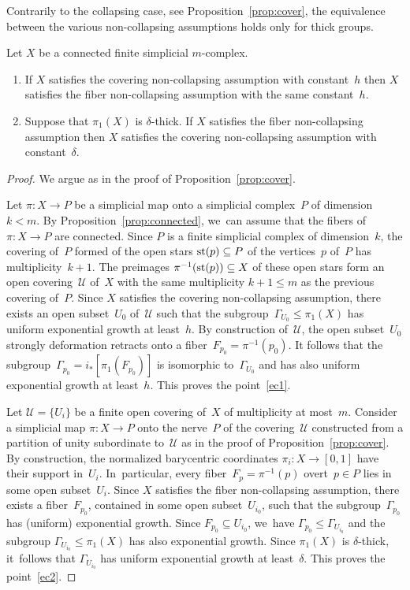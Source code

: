 Contrarily to the collapsing case, see Proposition~\ref{prop:cover}, the equivalence between the various non-collapsing assumptions holds only for thick groups.

\begin{proposition} \label{prop:exp.cover}
Let $X$ be a connected finite simplicial $m$\nobreakdash-complex.
\begin{enumerate}
\item If $X$ satisfies the covering non-collapsing assumption with constant~$h$ then $X$ satisfies the fiber non-collapsing assumption with the same constant~$h$. \label{ec1}
\item Suppose that $\pi_1(X)$ is $\delta$-thick.
If $X$ satisfies the fiber non-collapsing assumption then $X$ satisfies the covering non-collapsing assumption with constant~$\delta$. \label{ec2}
\end{enumerate}
\end{proposition}

\begin{proof}
We argue as in the proof of Proposition~\ref{prop:cover}.

Let $\pi:X \to P$ be a simplicial map onto a simplicial complex~$P$ of dimension~$k < m$.
By Proposition~\ref{prop:connected}, we~can assume that the fibers of~$\pi:X \to P$ are connected.
Since $P$ is a finite simplicial complex of dimension~$k$, the covering of~$P$ formed of the open stars ${\rm st}(p) \subseteq P$ of the vertices~$p$ of~$P$ has multiplicity~$k+1$.
The preimages $\pi^{-1}({\rm st}(p)) \subseteq X$ of these open stars form an open covering~$\mathcal{U}$ of~$X$ with the same multiplicity $k+1 \leq m$ as the previous covering of~$P$.
Since $X$ satisfies the covering non-collapsing assumption, there exists an open subset~$U_0$ of~$\mathcal{U}$ such that the subgroup~$\Gamma_{U_0} \leqslant \pi_1(X)$ has uniform exponential growth at least~$h$.
By construction of~$\mathcal{U}$, the open subset~$U_0$ strongly deformation retracts onto a fiber~$F_{p_0}=\pi^{-1}(p_0)$.
It follows that the subgroup~$\Gamma_{p_0} = i_*[\pi_1(F_{p_0})]$ is isomorphic to~$\Gamma_{U_0}$ and has also uniform exponential growth at least~$h$.
This proves the point~\eqref{ec1}.

Let $\mathcal{U}=\{U_i\}$ be a finite open covering of~$X$ of multiplicity at most~$m$.
Consider a simplicial map $\pi:X \to P$ onto the nerve~$P$ of the covering~$\mathcal{U}$ constructed from a partition of unity subordinate to~$\mathcal{U}$ as in the proof of Proposition~\ref{prop:cover}.
By construction, the normalized barycentric coordinates $\pi_i:X \to [0,1]$ have their support in~$U_i$. In~particular, every fiber~$F_p=\pi^{-1}(p)$ overt~$p \in P$ lies in some open subset~$U_i$.
Since $X$ satisfies the fiber non-collapsing assumption, there exists a fiber~$F_{p_0}$, contained in some open subset~$U_{i_0}$, such that the subgroup~$\Gamma_{p_0}$ has (uniform) exponential growth.
Since $F_{p_0} \subseteq U_{i_0}$, we~have $\Gamma_{p_0} \leqslant \Gamma_{U_{i_0}}$ and the subgroup $\Gamma_{U_{i_0}} \leqslant \pi_1(X)$ has also exponential growth.
Since $\pi_1(X)$ is $\delta$-thick, it~follows that $\Gamma_{U_{i_0}}$ has uniform exponential growth at least~$\delta$.
This proves the point~\eqref{ec2}.
\end{proof}

